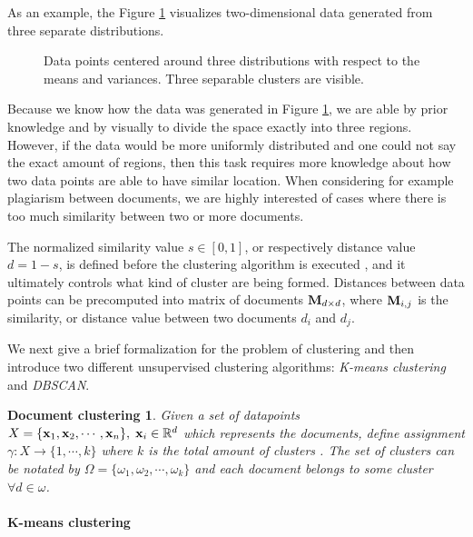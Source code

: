 As an example, the Figure \ref{fig-clust-example} visualizes two-dimensional data generated from three separate distributions. 

\begin{figure}[ht]
\centering
\setlength\figureheight{7cm}
\setlength\figurewidth{7cm}

\caption{Data points centered around three distributions with respect to the means and variances. Three separable clusters are visible.} \label{fig-clust-example}
\end{figure}

\noindent
Because we know how the data was generated in Figure \ref{fig-clust-example}, we are able by prior knowledge and by visually to divide the space exactly into three regions. However, if the data would be more uniformly distributed and one could not say the exact amount of regions, then this task requires more knowledge about how two data points are able to have similar location. When considering for example plagiarism between documents, we are highly interested of cases where there is too much similarity between two or more documents. 


The normalized similarity value $s \in [0, 1]$, or respectively distance value $d = 1 - s$, is defined before the clustering algorithm is executed \cite{hastie_09_elements-of.statistical-learning}, and it ultimately controls what kind of cluster are being formed. Distances between data points can be precomputed into matrix of documents $\mathbf{M}_{d \times d}$, where $\mathbf{M}_{i, j}$ is the similarity, or distance value between two documents $d_i$ and $d_j$. 

We next give a brief formalization for the problem of clustering and then introduce two different unsupervised clustering algorithms: \emph{K-means clustering} and \emph{DBSCAN}.

\newtheorem*{docclus}{Document clustering}
\begin{docclus}
Given a set of datapoints $X = \{\mathbf{x}_1, \mathbf{x}_2, \cdots, \mathbf{x}_n\},  \; \mathbf{x}_i \in \mathbb{R}^d$ which represents the documents, define assignment $\gamma: X \rightarrow \{1, \cdots, k\}$ where $k$ is the total amount of clusters \cite{Manning:2008:IIR:1394399}. The set of clusters can be notated by $\Omega = \{\omega_1, \omega_2, \cdots, \omega_k\}$ and each document belongs to some cluster $\forall d \in \omega$. 
\end{docclus}


\paragraph{K-means clustering}


